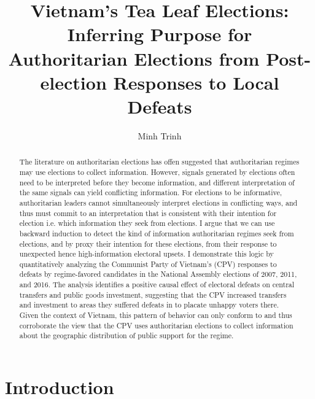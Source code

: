 \documentclass[12pt]{article}\usepackage[]{graphicx}\usepackage[]{color}
\title{Vietnam's Tea Leaf Elections: \\
	Inferring Purpose for Authoritarian Elections from Post-election Responses to Local Defeats}
\author{Minh Trinh}
\newcommand{\1}{\mathbbm{1}}
\begin{document}
\maketitle

\begin{abstract}
The literature on authoritarian elections has offen suggested that authoritarian regimes may use elections to collect information. However, signals generated by elections often need to be interpreted before they become information, and different interpretation of the same signals can yield conflicting information. For elections to be informative, authoritarian leaders cannot simultaneously interpret elections in conflicting ways, and thus must commit to an interpretation that is consistent with their intention for election i.e. which information they seek from elections. I argue that we can use backward induction to detect the kind of information authoritarian regimes seek from elections, and by proxy their intention for these elections, from their response to unexpected hence high-information electoral upsets. I demonstrate this logic by quantitatively analyzing the Communist Party of Vietnam's (CPV) responses to defeats by regime-favored candidates in the National Assembly elections of 2007, 2011, and 2016. The analysis identifies a positive causal effect of electoral defeats on central transfers and public goods investment, suggesting that the CPV increased transfers and investment to areas they suffered defeats in to placate unhappy voters there. Given the context of Vietnam, this pattern of behavior can only conform to and thus corroborate the view that the CPV uses authoritarian elections to collect information about the geographic distribution of public support for the regime.
\end{abstract}

\doublespacing

\section{Introduction}
\end{document}
